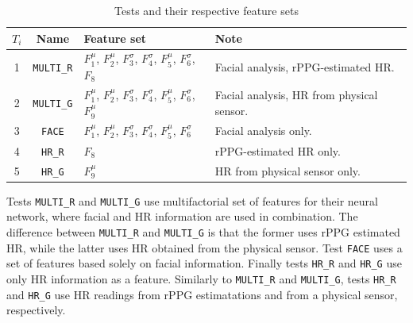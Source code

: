 \begin{table}
    \centering
    \caption{Tests and their respective feature sets}
    \label{table:study5-different-feature-sets}
    \begin{tabular}[l]{@{}cclp{4.0cm}}
        \hline
            \textbf{$T_i$} & \textbf{Name} & \textbf{Feature set} & \textbf{Note} \\
        \hline
            1 & \texttt{MULTI\_R} & $F_1^\mu$, $F_2^\mu$, $F_3^\sigma$, $F_4^\sigma$, $F_5^\mu$, $F_6^\sigma$, $F_8$ & Facial analysis, rPPG-estimated HR.\\ %
            2 & \texttt{MULTI\_G} & $F_1^\mu$, $F_2^\mu$, $F_3^\sigma$, $F_4^\sigma$, $F_5^\mu$, $F_6^\sigma$, $F_9^\mu$ & Facial analysis, HR from physical sensor.\\ %
            3 & \texttt{FACE} & $F_1^\mu$, $F_2^\mu$, $F_3^\sigma$, $F_4^\sigma$, $F_5^\mu$, $F_6^\sigma$ & Facial analysis only. \\ %
            4 & \texttt{HR\_R} & $F_8$ & rPPG-estimated HR only.\\ %
            5 & \texttt{HR\_G} & $F_9^\mu$ & HR from physical sensor only. \\ %
        \hline
    \end{tabular}
\end{table}

Tests \texttt{MULTI\_R} and \texttt{MULTI\_G} use multifactorial set of features for their neural network, where facial and HR information are used in combination. The difference between \texttt{MULTI\_R} and \texttt{MULTI\_G} is that the former uses rPPG estimated HR, while the latter uses HR obtained from the physical sensor. Test \texttt{FACE} uses a set of features based solely on facial information. Finally tests \texttt{HR\_R} and \texttt{HR\_G} use only HR information as a feature. Similarly to \texttt{MULTI\_R} and \texttt{MULTI\_G}, tests \texttt{HR\_R} and \texttt{HR\_G} use HR readings from rPPG estimatations and from a physical sensor, respectively.

